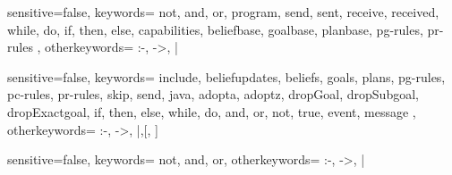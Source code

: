 
\lstset{
	captionpos=b,
	commentstyle=\itshape,
	identifierstyle=\ttfamily,
	basicstyle=\normalsize
	}
\renewcommand\lstlistingname{Code fragment}


{sensitive=false,
 keywords={	not, and, or, program, send, sent, receive, received, while, do, if,
						then, else, capabilities, beliefbase, goalbase, planbase, pg-rules,
						pr-rules },
 otherkeywords={ :-, ->, | }
}


{sensitive=false,
 keywords={ include, beliefupdates, beliefs, goals, plans, pg-rules, pc-rules,
 pr-rules, skip, send, java, adopta, adoptz, dropGoal, dropSubgoal,
 dropExactgoal, if, then, else, while, do, and, or, not, true, event, message },
 otherkeywords={ :-, ->, |,[, ] }
}


{sensitive=false,
 keywords={	not, and, or},
 otherkeywords={ :-, ->, | }
}


\newcommand{\iapapl}[1]{\lstinline[language=2APL]!#1!}



\newcommand{\apapl}[3]{ %
  \begin{figure}[ht]
    
	\end{figure}	
}

